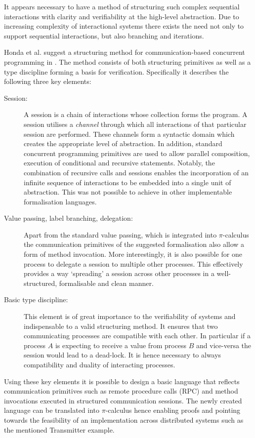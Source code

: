 It appears necessary to have a method of structuring such complex sequential interactions with clarity and verifiability at the high-level abstraction. Due to increasing complexity of interactional systems there exists the need not only to support sequential interactions, but also branching and iterations.

Honda et al. suggest a structuring method for communication-based concurrent programming in \cite{language_primitives}. The method consists of both structuring primitives as well as a type discipline forming a basis for verification. Specifically it describes the following three key elements:

\begin{description}
  \item[Session:] A session is a chain of interactions whose collection forms the program. A session utilises a \textit{channel} through which all interactions of that particular session are performed. These channels form a syntactic domain which creates the appropriate level of abstraction. In addition, standard concurrent programming primitives are used to allow parallel composition, execution of conditional and recursive statements. Notably, the combination of recursive calls and sessions enables the incorporation of an infinite sequence of interactions to be embedded into a single unit of abstraction. This was not possible to achieve in other implementable formalisation languages.
  \item[Value passing, label branching, delegation:] Apart from the standard value passing, which is integrated into $\pi$-calculus the communication primitives of the suggested formalisation also allow a form of method invocation. More interestingly, it is also possible for one process to delegate a session to multiple other processes. This effectively provides a way `spreading' a session across other processes in a well-structured, formalisable and clean manner.
  \item[Basic type discipline:] This element is of great importance to the verifiability of systems and indispensable to a valid structuring method. It ensures that two communicating processes are compatible with each other. In particular if a process $A$ is expecting to receive a value from process $B$ and vice-versa the session would lead to a dead-lock. It is hence necessary to always compatibility and duality of interacting processes.
\end{description}

Using these key elements it is possible to design a basic language that reflects communication primitives such as remote procedure calls (RPC) and method invocations executed in structured communication sessions. The newly created language can be translated into $\pi$-calculus hence enabling proofs and pointing towards the feasibility of an implementation across distributed systems such as the mentioned Transmitter example.

